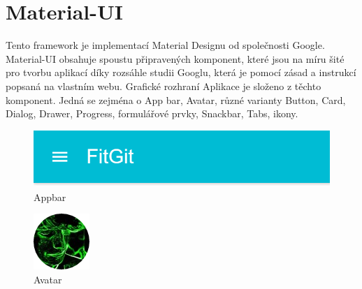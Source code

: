 \section{Material-UI}

Tento framework je implementací Material Designu od společnosti Google. Material-UI obsahuje spoustu připravených komponent, které jsou na míru šité pro tvorbu aplikací díky rozsáhle studii Googlu, která je pomocí zásad a instrukcí popsaná na vlastním webu. Grafické rozhraní Aplikace je složeno z těchto komponent. Jedná se zejména o App bar, Avatar, různé varianty Button, Card, Dialog, Drawer, Progress, formulářové prvky, Snackbar, Tabs, ikony.

\begin{figure}[h]
	\centering
	\includegraphics[scale=0.5]{sections/ui/images/Appbar.png}
	\caption{Appbar}
\end{figure}

\begin{figure}[h]
	\centering
	\includegraphics[scale=0.5]{sections/ui/images/Avatar.png}
	\caption{Avatar}
\end{figure}


